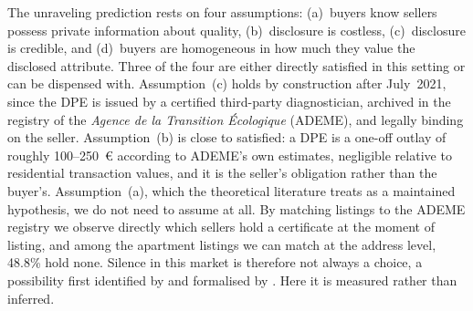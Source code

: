 The unraveling prediction rests on four assumptions: (a)~buyers know sellers possess private
information about quality, (b)~disclosure is costless, (c)~disclosure is credible, and
(d)~buyers are homogeneous in how much they value the disclosed attribute. Three of the four are
either directly satisfied in this setting or can be dispensed with. Assumption~(c) holds by
construction after July~2021, since the DPE is issued by a certified third-party diagnostician,
archived in the registry of the \emph{Agence de la Transition \'Ecologique} (ADEME), and legally
binding on the seller. Assumption~(b) is close to satisfied: a DPE is a one-off outlay of
roughly 100--250~\euro{} according to ADEME's own estimates, negligible relative to
residential transaction values, and it is the seller's obligation rather than the buyer's.
Assumption~(a), which the theoretical literature treats as a maintained hypothesis, we do not
need to assume at all. By matching listings to the ADEME registry we observe directly which
sellers hold a certificate at the moment of listing, and among the apartment listings we can
match at the address level, 48.8\% hold none.
Silence in this market is therefore not always a choice, a possibility first identified by
\citet{dye_disclosure_1985} and formalised by \citet{jung_kwon_1988}. Here it is measured
rather than inferred.
